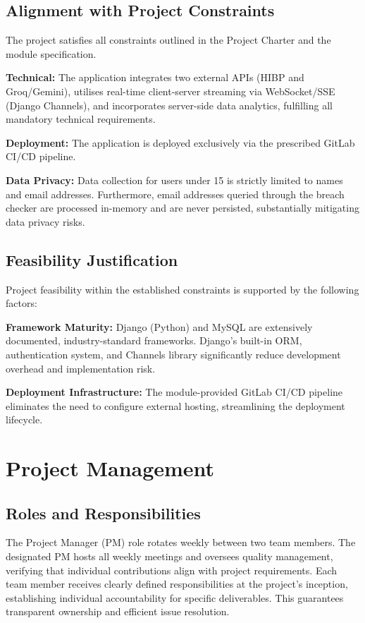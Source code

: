 \documentclass[11pt, a4paper]{report}
\begin{document}
\subsection{Alignment with Project Constraints}
The project satisfies all constraints outlined in the Project Charter and the module specification. 

\textbf{Technical:} The application integrates two external APIs (HIBP and Groq/Gemini), utilises real-time client-server streaming via WebSocket/SSE (Django Channels), and incorporates server-side data analytics, fulfilling all mandatory technical requirements. 

\textbf{Deployment:} The application is deployed exclusively via the prescribed GitLab CI/CD pipeline.

\textbf{Data Privacy:} Data collection for users under 15 is strictly limited to names and email addresses. Furthermore, email addresses queried through the breach checker are processed in-memory and are never persisted, substantially mitigating data privacy risks.

\subsection{Feasibility Justification}
Project feasibility within the established constraints is supported by the following factors: 

\textbf{Framework Maturity:} Django (Python) and MySQL are extensively documented, industry-standard frameworks. Django's built-in ORM, authentication system, and Channels library significantly reduce development overhead and implementation risk.

\textbf{Deployment Infrastructure:} The module-provided GitLab CI/CD pipeline eliminates the need to configure external hosting, streamlining the deployment lifecycle.

\section{Project Management}

\subsection{Roles and Responsibilities}
The Project Manager (PM) role rotates weekly between two team members. The designated PM hosts all weekly meetings and oversees quality management, verifying that individual contributions align with project requirements. Each team member receives clearly defined responsibilities at the project's inception, establishing individual accountability for specific deliverables. This guarantees transparent ownership and efficient issue resolution.  
\end{document}
